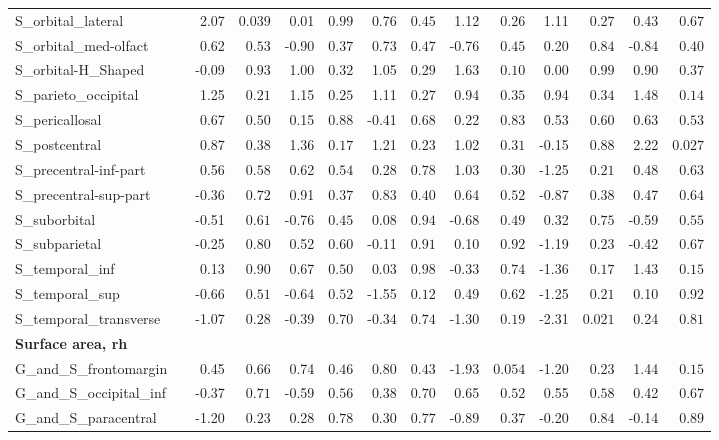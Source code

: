 {\begin{longtable}{llrrrrrrrrrrrr}
S\_orbital\_lateral &  & 2.07 & $0.039$ & 0.01 & $0.99$ & 0.76 & $0.45$ & 1.12 & $0.26$ & 1.11 & $0.27$ & 0.43 & $0.67$ \\
S\_orbital\_med-olfact &  & 0.62 & $0.53$ & -0.90 & $0.37$ & 0.73 & $0.47$ & -0.76 & $0.45$ & 0.20 & $0.84$ & -0.84 & $0.40$ \\
S\_orbital-H\_Shaped &  & -0.09 & $0.93$ & 1.00 & $0.32$ & 1.05 & $0.29$ & 1.63 & $0.10$ & 0.00 & $0.99$ & 0.90 & $0.37$ \\
S\_parieto\_occipital &  & 1.25 & $0.21$ & 1.15 & $0.25$ & 1.11 & $0.27$ & 0.94 & $0.35$ & 0.94 & $0.34$ & 1.48 & $0.14$ \\
S\_pericallosal &  & 0.67 & $0.50$ & 0.15 & $0.88$ & -0.41 & $0.68$ & 0.22 & $0.83$ & 0.53 & $0.60$ & 0.63 & $0.53$ \\
S\_postcentral &  & 0.87 & $0.38$ & 1.36 & $0.17$ & 1.21 & $0.23$ & 1.02 & $0.31$ & -0.15 & $0.88$ & 2.22 & $0.027$ \\
S\_precentral-inf-part &  & 0.56 & $0.58$ & 0.62 & $0.54$ & 0.28 & $0.78$ & 1.03 & $0.30$ & -1.25 & $0.21$ & 0.48 & $0.63$ \\
S\_precentral-sup-part &  & -0.36 & $0.72$ & 0.91 & $0.37$ & 0.83 & $0.40$ & 0.64 & $0.52$ & -0.87 & $0.38$ & 0.47 & $0.64$ \\
S\_suborbital &  & -0.51 & $0.61$ & -0.76 & $0.45$ & 0.08 & $0.94$ & -0.68 & $0.49$ & 0.32 & $0.75$ & -0.59 & $0.55$ \\
S\_subparietal &  & -0.25 & $0.80$ & 0.52 & $0.60$ & -0.11 & $0.91$ & 0.10 & $0.92$ & -1.19 & $0.23$ & -0.42 & $0.67$ \\
S\_temporal\_inf &  & 0.13 & $0.90$ & 0.67 & $0.50$ & 0.03 & $0.98$ & -0.33 & $0.74$ & -1.36 & $0.17$ & 1.43 & $0.15$ \\
S\_temporal\_sup &  & -0.66 & $0.51$ & -0.64 & $0.52$ & -1.55 & $0.12$ & 0.49 & $0.62$ & -1.25 & $0.21$ & 0.10 & $0.92$ \\
S\_temporal\_transverse &  & -1.07 & $0.28$ & -0.39 & $0.70$ & -0.34 & $0.74$ & -1.30 & $0.19$ & -2.31 & $0.021$ & 0.24 & $0.81$ \\
\midrule\multicolumn{14}{l}{\textbf{Surface area, rh}} \\
G\_and\_S\_frontomargin &  & 0.45 & $0.66$ & 0.74 & $0.46$ & 0.80 & $0.43$ & -1.93 & $0.054$ & -1.20 & $0.23$ & 1.44 & $0.15$ \\
G\_and\_S\_occipital\_inf &  & -0.37 & $0.71$ & -0.59 & $0.56$ & 0.38 & $0.70$ & 0.65 & $0.52$ & 0.55 & $0.58$ & 0.42 & $0.67$ \\
G\_and\_S\_paracentral &  & -1.20 & $0.23$ & 0.28 & $0.78$ & 0.30 & $0.77$ & -0.89 & $0.37$ & -0.20 & $0.84$ & -0.14 & $0.89$ \\

\end{longtable}}
